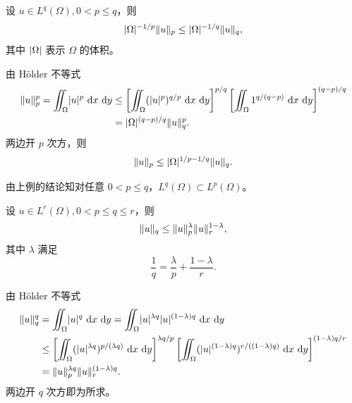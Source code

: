 \begin{xexample}[22.5.8]
设 $u\in L^q(\Omega),0<p\le q$，则
\[
  \lvert\Omega\rvert^{-1/p}\lVert u\rVert_p\le\lvert\Omega\rvert^{-1/q}\lVert u\rVert_q,
\]
其中 $\lvert\Omega\rvert$ 表示 $\Omega$ 的体积。
\end{xexample}
\begin{xproof}
由 Hölder 不等式
\begin{align*}
  \lVert u\rVert_p^p=\iint_\Omega\lvert u\rvert^p\,\mathop{}\!\mathrm{d} x\,\mathop{}\!\mathrm{d} y
  &\le\left[\iint_\Omega(\lvert u\rvert^p)^{q/p}\,\mathop{}\!\mathrm{d} x\,\mathop{}\!\mathrm{d} y\right]^{p/q}
  \left[\iint_\Omega1^{q/(q-p)}\,\mathop{}\!\mathrm{d} x\,\mathop{}\!\mathrm{d} y\right]^{(q-p)/q}\\
  &=\lvert\Omega\rvert^{(q-p)/q}\lVert u\rVert_q^p.
\end{align*}
两边开 $p$ 次方，则
\[
  \lVert u\rVert_p\le\lvert\Omega\rvert^{1/p-1/q}\lVert u\rVert_q.
\]
\end{xproof}

\begin{xremark}
由上例的结论知对任意 $0<p\le q$，$L^q(\Omega)\subset L^p(\Omega)$。
\end{xremark}

\begin{xexample}[22.5.9]
设 $u\in L^r(\Omega),0<p\le q\le r$，则
\[
  \lVert u\rVert_q\le\lVert u\rVert_p^\lambda\lVert u\rVert_r^{1-\lambda},
\]
其中 $\lambda$ 满足
\[
  \frac1q=\frac\lambda p+\frac{1-\lambda}{r}.
\]
\end{xexample}
\begin{xproof}
由 Hölder 不等式
\begin{align*}
  \norm{u}_q^q
  &=\iint_\Omega\abs{u}^q\,\dd x\,\dd y
  =\iint_\Omega\abs{u}^{\lambda q}\abs{u}^{(1-\lambda)q}\,\dd x\,\dd y\\
  &\le\left[\iint_\Omega(\abs{u}^{\lambda q})^{p/(\lambda q)}\,\dd x\,\dd y\right]^{\lambda q/p}
  \left[\iint_\Omega(\abs{u}^{(1-\lambda)q})^{r/((1-\lambda)q)}\,\dd x\,\dd y\right]^{(1-\lambda)q/r}\\
  &=\norm{u}_p^{\lambda q}\norm{u}_r^{(1-\lambda)q}.
\end{align*}
两边开 $q$ 次方即为所求。
\end{xproof}


